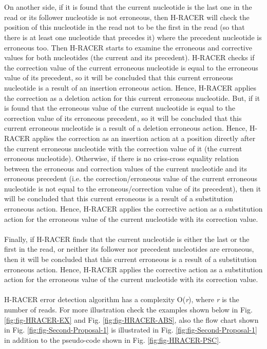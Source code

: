 \documentclass[12pt]{llncs}
\begin{document}
\\
\\
On another side, if it is found that the current nucleotide is the last one in the read or its follower nucleotide is not erroneous, then H-RACER will check the position of this nucleotide in the read not to be the first in the read (so that there is at least one nucleotide that precedes it) where the precedent nucleotide is erroneous too. Then H-RACER starts to examine the erroneous and corrective values for both nucleotides (the current and its precedent). H-RACER checks if the correction value of the current erroneous nucleotide is equal to the erroneous value of its precedent, so it will be concluded that this current erroneous nucleotide is a result of an insertion erroneous action. Hence, H-RACER applies the correction as a deletion action for this current erroneous nucleotide. But, if it is found that the erroneous value of the current nucleotide is equal to the correction value of its erroneous precedent, so it will be concluded that this current erroneous nucleotide is a result of a deletion erroneous action. Hence, H-RACER applies the correction as an insertion action at a position directly after the current erroneous nucleotide with the correction value of it (the current erroneous nucleotide). Otherwise, if there is no criss-cross equality relation between the erroneous and correction values of the current nucleotide and its erroneous precedent (i.e. the correction/erroneous value of the current erroneous nucleotide is not equal to the erroneous/correction value of its precedent), then it will be concluded that this current erroneous is a result of a substitution erroneous action. Hence, H-RACER applies the corrective action as a substitution action for the erroneous value of the current nucleotide with its correction value.
\\
\\
Finally, if H-RACER finds that the current nucleotide is either the last or the first in the read, or neither its follower nor precedent nucleotides are erroneous, then it will be concluded that this current erroneous is a result of a substitution erroneous action. Hence, H-RACER applies the corrective action as a substitution action for the erroneous value of the current nucleotide with its correction value.
\\
\\
H-RACER error detection algorithm has a complexity O(\textit{r}), where \textit{r} is the number of reads. For more illustration check the examples shown below in Fig. \ref{fig:fig-HRACER-EX} and Fig. \ref{fig:fig-HRACER-ABS}, also the flow chart shown in Fig. \ref{fig:fig-Second-Proposal-1} is illustrated in Fig. \ref{fig:fig-Second-Proposal-1} in addition to the pseudo-code shown in Fig. \ref{fig:fig-HRACER-PSC}.
\end{document}

